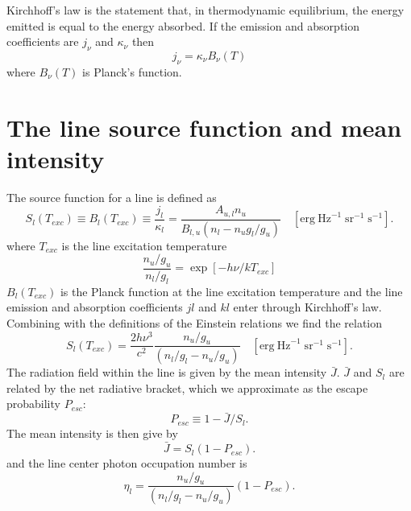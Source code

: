 Kirchhoff's law is the statement that, in thermodynamic equilibrium,
the energy emitted is equal to the energy absorbed.  If the emission and
absorption coefficients are $j_{\nu}$ and $\kappa_{\nu}$ then
\begin{equation}
j_{\nu} = \kappa_{\nu} B_{\nu}(T)
\end{equation}
where $B_{\nu}(T)$ is Planck's function.

\section{The line source function and mean intensity}

The source function for a line is defined as
\begin{equation}
{S_l}\left( {{T_{exc}}} \right) \equiv {B_l}\left( {{T_{exc}}} \right)
\equiv \frac{{{j_l}}}{{{\kappa _l}}} =
\frac{{{A_{u,l}}{n_u}}}{{{B_{l,u}}\left( {{n_l} - {n_u}{g_l}/{g_u}}
\right)}}
\quad
  [\mathrm{erg~Hz}^{-1}\; \mathrm{sr}^{-1}\; \mathrm{s}^{-1}].
\end{equation}
where $T_{exc}$ is the line excitation temperature
\begin{equation}
\frac{{{n_u}/{g_u}}}{{{n_l}/{g_l}}} = \exp \left[ { - h\nu /k{T_{exc}}}
\right]
\end{equation}
$B_l(T_{exc})$ is the Planck function at the line excitation
temperature and the
line emission and absorption coefficients $jl$ and $kl$
enter through Kirchhoff's law.
Combining with the definitions of the Einstein relations we find the
relation
\begin{equation}
{S_l}\left( {{T_{exc}}} \right) = \frac{{2h{\nu
^3}}}{{{c^2}}}\frac{{{n_u}/{g_u}}}{{\left( {{n_l}/{g_l} - {n_u}/{g_u}}
\right)}}
\quad  [\mathrm{erg~Hz}^{-1}\; \mathrm{sr}^{-1}\; \mathrm{s}^{-1}].
\end{equation}
The radiation field within the line is given by the mean intensity
$\bar J$.
$\bar J$  and $S_l$ are related by the net radiative bracket,
which we approximate as
the escape probability $P_{esc}$:
\begin{equation}
{P_{esc}} \equiv 1 - \bar J/{S_l}. %
\end{equation}
The mean intensity is then give by
\begin{equation}
\bar J = {S_l}\left( {1 - {P_{esc}}} \right) .%
\end{equation}
and the line center photon occupation number is
\begin{equation}
{\eta _l} = \frac{{{n_u}/{g_u}}}{{\left( {{n_l}/{g_l} - {n_u}/{g_u}}
\right)}}\left( {1 - {P_{esc}}} \right).
\end{equation}

